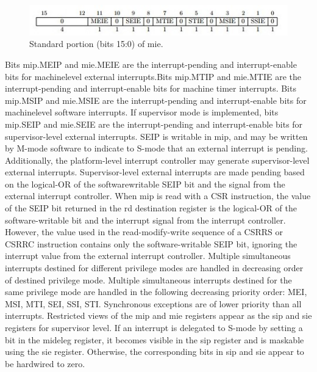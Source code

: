 \documentclass[../main.tex]{subfiles}
\begin{document}
\begin{itemize}
        \begin{figure}[h]
            \centering
            \includegraphics[width=12 cm]{diagrams/mie.jpg}
            \caption{Standard portion (bits 15:0) of mie.}
            \label{fig:mie}
        \end{figure}
        Bits mip.MEIP and mie.MEIE are the interrupt-pending and interrupt-enable bits for machinelevel external interrupts.Bits mip.MTIP and mie.MTIE are the interrupt-pending and interrupt-enable bits for machine timer interrupts. Bits mip.MSIP and mie.MSIE are the interrupt-pending and interrupt-enable bits for machinelevel software interrupts. If supervisor mode is implemented, bits mip.SEIP and mie.SEIE are the interrupt-pending and interrupt-enable bits for supervisor-level external interrupts. SEIP is writable in mip, and may be written by M-mode software to indicate to S-mode that an external interrupt is pending. Additionally, the platform-level interrupt controller may generate supervisor-level external interrupts. Supervisor-level external interrupts are made pending based on the logical-OR of the softwarewritable SEIP bit and the signal from the external interrupt controller. When mip is read with a CSR instruction, the value of the SEIP bit returned in the rd destination register is the logical-OR of the software-writable bit and the interrupt signal from the interrupt controller. However, the value used in the read-modify-write sequence of a CSRRS or CSRRC instruction contains only the software-writable SEIP bit, ignoring the interrupt value from the external interrupt controller. Multiple simultaneous interrupts destined for different privilege modes are handled in decreasing order of destined privilege mode. Multiple simultaneous interrupts destined for the same privilege mode are handled in the following decreasing priority order: MEI, MSI, MTI, SEI, SSI, STI. Synchronous exceptions are of lower priority than all interrupts. Restricted views of the mip and mie registers appear as the sip and sie registers for supervisor level. If an interrupt is delegated to S-mode by setting a bit in the mideleg register, it becomes visible in the sip register and is maskable using the sie register. Otherwise, the corresponding bits in sip and sie appear to be hardwired to zero.\\
        

\end{itemize}
\end{document}
